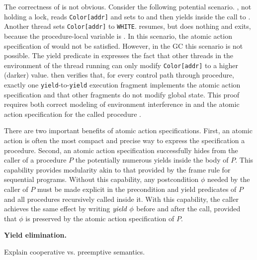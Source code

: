 The correctness of  is not obvious.
Consider the following potential scenario. 
, not holding a lock, reads {\tt Color[addr]} and
sets  to  and then yields inside the call to
. Another thread sets {\tt Color[addr]} to
{\tt WHITE}.  resumes, but does nothing and exits,
because the procedure-local variable  is . In this scenario, the atomic action
specification of  would not be satisfied. However, in the GC this
scenario is not possible. 
The yield predicate in  expresses the fact that
other threads in the environment of the thread running  can
only modify {\tt Color[addr]} to a higher (darker) value. 
\civl then verifies that, for every control path through 
procedure, exactly one {\tt yield}-to-{\tt yield} execution
fragment implements the atomic action specification and that other fragments do not modify
global state. 
This proof requires both correct modeling of environment interference in 
and the atomic action specification for the called procedure .

There are two important benefits of atomic action specifications.
First, an atomic action is often the most compact and precise way to express the specification a procedure.
Second, an atomic action specification successfully hides from the caller of a procedure $P$
the potentially numerous yields inside the body of $P$.
This capability provides modularity akin to that provided by the frame rule for sequential programs.
Without this capability, any postcondition $\phi$ needed by the caller of $P$ must be made explicit in the precondition 
and yield predicates of $P$ and all procedures recursively called inside it.
With this capability, the caller achieves the same effect by writing $\mathit{yield}\ \phi$ before and after the call, 
provided that $\phi$ is preserved by the atomic action specification of $P$.

{\bf Yield elimination.} 

Explain cooperative vs. preemptive semantics.

